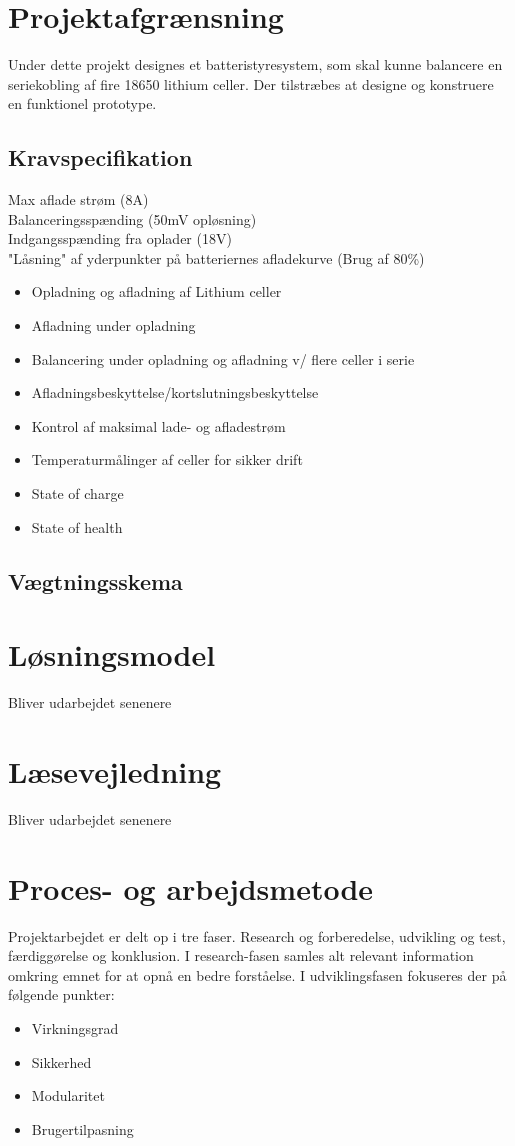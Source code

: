 \section{Projektafgrænsning}
Under dette projekt designes et batteristyresystem, som skal kunne balancere en seriekobling af fire 18650 lithium celler. Der tilstræbes at designe og konstruere en funktionel prototype.
\subsection{Kravspecifikation} \label{afs:kravspecifikation}
Max aflade strøm (8A) \\
Balanceringsspænding (50mV opløsning) \\
Indgangsspænding fra oplader (18V)\\
"Låsning" af yderpunkter på batteriernes afladekurve (Brug af 80\%)



\begin{itemize}
	\item Opladning og afladning af Lithium celler
	\item Afladning under opladning
	\item Balancering under opladning og afladning v/ flere celler i serie
	\item Afladningsbeskyttelse/kortslutningsbeskyttelse
	\item Kontrol af maksimal lade- og afladestrøm
	\item Temperaturmålinger af celler for sikker drift
	\item State of charge
	\item State of health
\end{itemize}

\subsection{Vægtningsskema}

\section{Løsningsmodel}
Bliver udarbejdet senenere

\section{Læsevejledning}
Bliver udarbejdet senenere

\section{Proces- og arbejdsmetode}
Projektarbejdet er delt op i tre faser. Research og forberedelse, udvikling og test, færdiggørelse og konklusion. I research-fasen samles alt relevant information omkring emnet for at opnå en bedre forståelse. I udviklingsfasen fokuseres der på følgende punkter: 
\begin{itemize}
	\item Virkningsgrad
	\item Sikkerhed
	\item Modularitet
	\item Brugertilpasning
\end{itemize}


